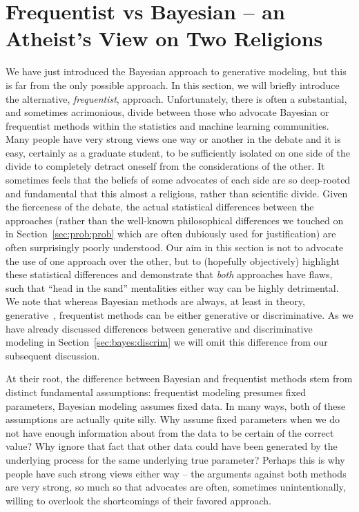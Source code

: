 
\section{Frequentist vs Bayesian -- an Atheist's View on Two Religions}
\label{sec:bayes:religions}

We have just introduced the Bayesian approach to generative modeling, but this is far from
the only possible approach.  In this section, we will briefly introduce the alternative, \emph{frequentist},
approach.
  Unfortunately, there is often a substantial, and sometimes acrimonious, divide between those
who advocate Bayesian or frequentist methods within the statistics and machine learning communities.  Many people
have very strong views one way or another in the debate and it is easy, certainly as a graduate student,
to be sufficiently isolated on one side of the divide to completely detract oneself from the considerations of the
other.  It sometimes feels that the beliefs of some advocates of each side are so deep-rooted and 
fundamental that this almost a religious, rather than scientific divide.  Given the fierceness of the debate,
the actual statistical differences between the approaches (rather than the well-known philosophical differences we touched
on in Section~\ref{sec:prob:prob} which are often dubiously used for justification) are often surprisingly poorly understood.
Our aim in this section is not to advocate the use of one approach over the other, but to (hopefully objectively)
highlight these statistical differences and demonstrate that \emph{both} approaches have flaws, such that ``head in the sand''
mentalities either way can be highly detrimental.  
We note that whereas Bayesian methods are always, at least in theory, generative~\citep[Section~14.1]{gelman2014bayesian},
frequentist methods can be either generative or discriminative. 
As we have already discussed differences between generative and
discriminative modeling in Section~\ref{sec:bayes:discrim} we will omit this difference from our subsequent discussion.

At their root, the difference between Bayesian and frequentist methods stem from distinct fundamental
assumptions: frequentist modeling presumes fixed parameters, Bayesian modeling assumes fixed data.  In many ways,
both of these assumptions are actually quite silly. Why assume fixed parameters when we do not have enough
information about from the data to be certain of the correct value?  Why ignore that fact that other data could have 
been generated by the underlying process for the same underlying true parameter?  Perhaps this is why people have
such strong views either way -- the arguments against both methods are very strong, so much so that advocates are
often, sometimes unintentionally, willing to overlook the shortcomings of their favored approach.  

